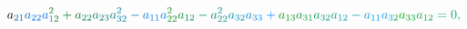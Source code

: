 \documentclass[12pt]{article}
\begin{document}
\begin{displaymath}
{a} _ { \mathcolor[RGB]{0,105,165}{2} \mathcolor[RGB]{0,105,180}{1} } \mathcolor[RGB]{0,105,195}{a} _ { \mathcolor[RGB]{0,105,210}{2} \mathcolor[RGB]{0,105,225}{2} } \mathcolor[RGB]{0,105,240}{a} _ { \mathcolor[RGB]{0,105,255}{1} \mathcolor[RGB]{0,120,0}{2} } ^ { \mathcolor[RGB]{0,120,15}{2} } \mathcolor[RGB]{0,120,30}{+} \mathcolor[RGB]{0,120,45}{a} _ { \mathcolor[RGB]{0,120,60}{2} \mathcolor[RGB]{0,120,75}{2} } \mathcolor[RGB]{0,120,90}{a} _ { \mathcolor[RGB]{0,120,105}{2} \mathcolor[RGB]{0,120,120}{3} } \mathcolor[RGB]{0,120,135}{a} _ { \mathcolor[RGB]{0,120,150}{3} \mathcolor[RGB]{0,120,165}{2} } ^ { \mathcolor[RGB]{0,120,180}{2} } \mathcolor[RGB]{0,120,195}{-} \mathcolor[RGB]{0,120,210}{a} _ { \mathcolor[RGB]{0,120,225}{1} \mathcolor[RGB]{0,120,240}{1} } \mathcolor[RGB]{0,120,255}{a} _ { \mathcolor[RGB]{0,135,0}{2} \mathcolor[RGB]{0,135,15}{2} } ^ { \mathcolor[RGB]{0,135,30}{2} } \mathcolor[RGB]{0,135,45}{a} _ { \mathcolor[RGB]{0,135,60}{1} \mathcolor[RGB]{0,135,75}{2} } \mathcolor[RGB]{0,135,90}{-} \mathcolor[RGB]{0,135,105}{a} _ { \mathcolor[RGB]{0,135,120}{2} \mathcolor[RGB]{0,135,135}{2} } ^ { \mathcolor[RGB]{0,135,150}{2} } \mathcolor[RGB]{0,135,165}{a} _ { \mathcolor[RGB]{0,135,180}{3} \mathcolor[RGB]{0,135,195}{2} } \mathcolor[RGB]{0,135,210}{a} _ { \mathcolor[RGB]{0,135,225}{3} \mathcolor[RGB]{0,135,240}{3} } \mathcolor[RGB]{0,135,255}{+} \mathcolor[RGB]{0,150,0}{a} _ { \mathcolor[RGB]{0,150,15}{1} \mathcolor[RGB]{0,150,30}{3} } \mathcolor[RGB]{0,150,45}{a} _ { \mathcolor[RGB]{0,150,60}{3} \mathcolor[RGB]{0,150,75}{1} } \mathcolor[RGB]{0,150,90}{a} _ { \mathcolor[RGB]{0,150,105}{3} \mathcolor[RGB]{0,150,120}{2} } \mathcolor[RGB]{0,150,135}{a} _ { \mathcolor[RGB]{0,150,150}{1} \mathcolor[RGB]{0,150,165}{2} } \mathcolor[RGB]{0,150,180}{-} \mathcolor[RGB]{0,150,195}{a} _ { \mathcolor[RGB]{0,150,210}{1} \mathcolor[RGB]{0,150,225}{1} } \mathcolor[RGB]{0,150,240}{a} _ { \mathcolor[RGB]{0,150,255}{3} \mathcolor[RGB]{0,165,0}{2} } \mathcolor[RGB]{0,165,15}{a} _ { \mathcolor[RGB]{0,165,30}{3} \mathcolor[RGB]{0,165,45}{3} } \mathcolor[RGB]{0,165,60}{a} _ { \mathcolor[RGB]{0,165,75}{1} \mathcolor[RGB]{0,165,90}{2} } \mathcolor[RGB]{0,165,105}{=} \mathcolor[RGB]{0,165,120}{0} \mathcolor[RGB]{0,165,135}{,} \mathcolor[RGB]{0,165,150}{\,
}
\end{displaymath}
\end{document}
